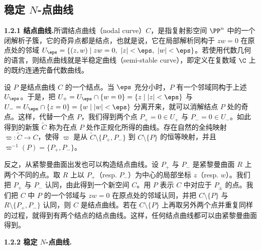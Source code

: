 \subsection{稳定 $N$-点曲线}
\noindent\textbf{1.2.1 结点曲线.}\quad 所谓结点曲线（nodal curve）$C$，是指复射影空间 $\PP^n$ 中的一个闭解析子簇，它的奇异点都是结点，也就是说，它在局部解析同构于 $zw=0$ 在原点处的邻域 $U_\eps=\{(z,w)\mid zw=0,\ |z|<\eps,\ |w|<\eps\}$。若使用代数几何的语言，则结点曲线就是半稳定曲线（semi-stable curve），即定义在复数域 $\C$ 上的既约连通完备代数曲线。

设 $P$ 是结点曲线 $C$ 的一个结点。当 $\eps$ 充分小时，$P$ 有一个邻域同构于上述 $U_\eps$。于是，把 $U_+=U_\eps\cap\{w=0\}=\{z\mid |z|<\eps\}$ 与 $U_-=U_\eps\cap\{z=0\}=\{w\mid |w|<\eps\}$ 分离开来，就可以消解结点 $P$ 处的奇点。这样，代替一个点 $P$，我们得到两个点 $P_+=0\in U_+$ 与 $P_-=0\in U_-$。如此得到的新簇 $\tilde C$ 称为在点 $P$ 处作正规化所得的曲线。存在自然的全纯映射 $\varpi:\tilde C\to C$，使得 $\varpi$ 是从 $\tilde C\setminus\{P_+,P_-\}$ 到 $C\setminus\{P\}$ 的恒等映射，并且 $\varpi^{-1}(P)=\{P_+,P_-\}$。


反之，从紧黎曼曲面出发也可以构造结点曲线。设 $P_+$ 与 $P_-$ 是紧黎曼曲面 $R$ 上两个不同的点。取 $R$ 上以 $P_+$（resp. $P_-$）为中心的局部坐标 $z$（resp. $w$）。我们把 $P_+$ 与 $P_-$ 认同，由此得到一个新空间 $C$。用 $P$ 表示 $C$ 中对应于 $P_\pm$ 的点。我们把 $C$ 中 $P$ 的一个邻域与 $zw=0$ 在原点处的邻域认同，并把 $C\setminus\{P\}$ 与 $R\setminus\{P_+,P_-\}$ 认同，则 $C$ 是结点曲线。若在 $C\setminus\{P\}$ 上再取另外两个点并重复同样的过程，就得到有两个结点的结点曲线。这样，任何结点曲线都可以由紧黎曼曲面得到。


\noindent\textbf{1.2.2 稳定 $N$-点曲线.}\quad

